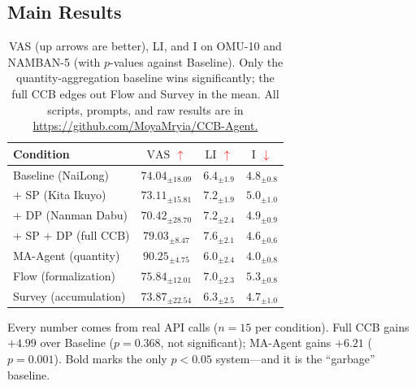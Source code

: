 \documentclass[conference,10pt]{IEEEtran}
\newcommand{\vup}{\textcolor{red}{\ensuremath{\uparrow}}}
\newcommand{\vdn}{\textcolor{red}{\ensuremath{\downarrow}}}
\newcommand{\vas}{\mathrm{VAS}}
\newcommand{\li}{\mathrm{LI}}
\newcommand{\inap}{\mathrm{I}}
\begin{document}
\subsection{Main Results}
\begin{table}[H]
\caption{VAS (up arrows are better), LI, and I on OMU-10 and NAMBAN-5
(with $p$-values against Baseline). Only the quantity-aggregation
baseline wins significantly; the full CCB edges out Flow and Survey
in the mean. All scripts, prompts, and raw results are in
\url{https://github.com/MoyaMryia/CCB-Agent.}}
\begin{tabular}{@{}lccc@{}}
\toprule
Condition & $\vas$ \vup & $\li$ \vup & $\inap$ \vdn\\
\midrule
Baseline (NaiLong)   & $74.04_{\pm18.09}$ & $6.4_{\pm1.9}$ & $4.8_{\pm0.8}$\\
+ SP (Kita Ikuyo)        & $73.11_{\pm15.81}$ & $7.2_{\pm1.9}$ & $5.0_{\pm1.0}$\\
+ DP (Nanman Dabu)       & $70.42_{\pm28.70}$ & $7.2_{\pm2.4}$ & $4.9_{\pm0.9}$\\
+ SP + DP (full CCB)     & $\mathbf{79.03_{\pm8.47}}$ & $7.6_{\pm2.1}$ & $4.6_{\pm0.6}$\\
\midrule
MA-Agent (quantity)          & $\mathbf{90.25_{\pm4.75}}$ & $6.0_{\pm2.4}$ & $4.0_{\pm0.8}$\\
Flow (formalization)         & $75.84_{\pm12.01}$ & $7.0_{\pm2.3}$ & $5.3_{\pm0.8}$\\
Survey (accumulation)        & $73.87_{\pm22.54}$ & $6.3_{\pm2.5}$ & $4.7_{\pm1.0}$\\
\bottomrule
\end{tabular}
\par\footnotesize Every number comes from real API calls ($n=15$
per condition). Full CCB gains $+4.99$ over Baseline ($p=0.368$,
not significant); MA-Agent gains $+6.21$ ($p=0.001$). Bold marks the
only $p<0.05$ system---and it is the ``garbage'' baseline.
\label{tab:main}
\end{table}

\FloatBarrier
\end{document}
